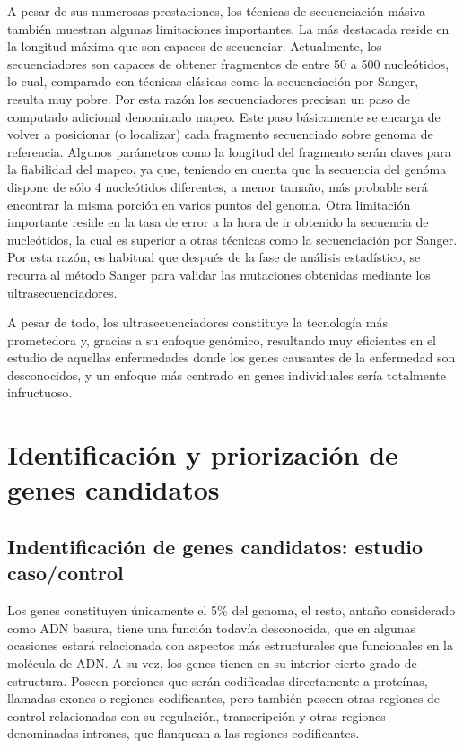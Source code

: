 \medskip
A pesar de sus numerosas prestaciones, los técnicas de secuenciación másiva también muestran algunas limitaciones importantes. La más destacada reside en la longitud máxima que son capaces de secuenciar. Actualmente, los secuenciadores son capaces de obtener fragmentos de entre 50 a 500 nucleótidos, lo cual, comparado con técnicas clásicas como la secuenciación por Sanger, resulta muy pobre. Por esta razón los secuenciadores precisan un paso de computado adicional denominado mapeo. Este paso básicamente se encarga de volver a posicionar (o localizar) cada fragmento secuenciado sobre genoma de referencia. Algunos parámetros como la longitud del fragmento serán claves para la fiabilidad del mapeo, ya que, teniendo en cuenta que la secuencia del genóma dispone de sólo 4 nucleótidos diferentes, a menor tamaño, más probable será encontrar la misma porción en varios puntos del genoma. Otra limitación importante reside en la tasa de error a la hora de ir obtenido la secuencia de nucleótidos, la cual es superior a otras técnicas como la secuenciación por Sanger. Por esta razón, es habitual que después de la fase de análisis estadístico, se recurra al método Sanger para validar las mutaciones obtenidas mediante los ultrasecuenciadores.

\medskip
A pesar de todo, los ultrasecuenciadores constituye la tecnología más prometedora y, gracias a su enfoque genómico, resultando muy eficientes en el estudio de aquellas enfermedades donde los genes causantes de la enfermedad son desconocidos, y un enfoque más centrado en genes individuales sería totalmente infructuoso.


\section{Identificación y priorización de genes candidatos}

\subsection{Indentificación de genes candidatos: estudio caso/control}


Los genes constituyen únicamente el 5\% del genoma, el resto, antaño considerado como ADN basura, tiene una función todavía desconocida, que en algunas  ocasiones estará relacionada con aspectos más estructurales que funcionales en la molécula de ADN. A su vez, los genes tienen en su interior cierto grado de estructura. Poseen porciones que serán codificadas directamente a proteínas, llamadas exones o regiones codificantes, pero también poseen otras regiones de control relacionadas con su regulación, transcripción y otras regiones denominadas intrones, que flanquean a las regiones codificantes.

